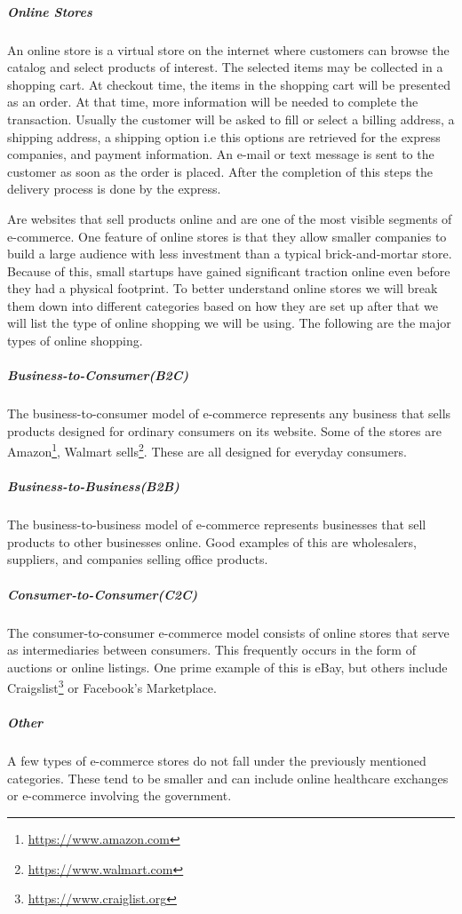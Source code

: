 \subparagraph{Online Stores} 
An online store is a virtual store on the internet where customers can browse the catalog and select products of interest. The selected items may be collected in a shopping cart. At checkout time, the items in the shopping cart will be presented as an order. At that time, more information will be needed to complete the transaction. Usually the customer will be asked to fill or select a billing address, a shipping address, a shipping option i.e this options are retrieved for the express companies, and payment information. An e-mail or text message is sent to the customer as soon as the order is placed. After the completion of this steps the delivery process is done by the express.

Are websites that sell products online and are one of the most visible segments of e-commerce. One feature of online stores is that they allow smaller companies to build a large audience with less investment than a typical brick-and-mortar store. Because of this, small startups have gained significant traction online even before they had a physical footprint. To better understand online stores we will break them down into different categories based on how they are set up after that we will list the type of online shopping we will be using. The following are the major types of online shopping.
\subparagraph{Business-to-Consumer(B2C)}
The business-to-consumer model of e-commerce represents any business that sells products designed for ordinary consumers on its website. Some of the stores are Amazon\footnote{\url{https://www.amazon.com}}, Walmart sells\footnote{\url{https://www.walmart.com}}. These are all designed for everyday consumers.


\subparagraph{Business-to-Business(B2B)} 
The business-to-business model of e-commerce represents businesses that sell products to other businesses online. Good examples of this are wholesalers, suppliers, and companies selling office products.


\subparagraph{Consumer-to-Consumer(C2C)}
The consumer-to-consumer e-commerce model consists of online stores that serve as intermediaries between consumers. This frequently occurs in the form of auctions or online listings. One prime example of this is eBay, but others include Craigslist\footnote{\url{https://www.craiglist.org}} or Facebook's Marketplace.


\subparagraph{Other}
 A few types of e-commerce stores do not fall under the previously mentioned categories. These tend to be smaller and can include online healthcare exchanges or e-commerce involving the government.

